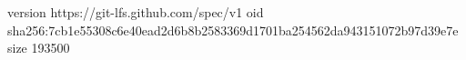 version https://git-lfs.github.com/spec/v1
oid sha256:7cb1e55308c6e40ead2d6b8b2583369d1701ba254562da943151072b97d39e7e
size 193500
